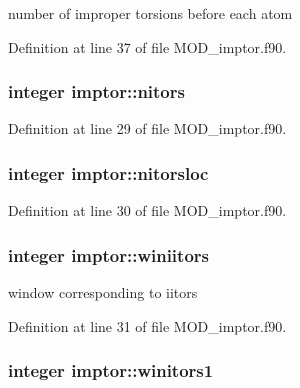 number of improper torsions before each atom 



Definition at line 37 of file M\-O\-D\-\_\-imptor.\-f90.

\hypertarget{classimptor_a7f604e2de3b7f5ba4b6136c0dc063862}{
\subsubsection[{nitors}]{\setlength{\rightskip}{0pt plus 5cm}integer imptor\-::nitors}}\label{classimptor_a7f604e2de3b7f5ba4b6136c0dc063862}


Definition at line 29 of file M\-O\-D\-\_\-imptor.\-f90.

\hypertarget{classimptor_a4a69a70b6d02dcc4c4d15eb06ede36ca}{
\subsubsection[{nitorsloc}]{\setlength{\rightskip}{0pt plus 5cm}integer imptor\-::nitorsloc}}\label{classimptor_a4a69a70b6d02dcc4c4d15eb06ede36ca}


Definition at line 30 of file M\-O\-D\-\_\-imptor.\-f90.

\hypertarget{classimptor_ab6ee996fa64bbafa67f7b735b001c73b}{
\subsubsection[{winiitors}]{\setlength{\rightskip}{0pt plus 5cm}integer imptor\-::winiitors}}\label{classimptor_ab6ee996fa64bbafa67f7b735b001c73b}


window corresponding to iitors 



Definition at line 31 of file M\-O\-D\-\_\-imptor.\-f90.

\hypertarget{classimptor_a4101ad922e3625ead34b2e133bf069df}{
\subsubsection[{winitors1}]{\setlength{\rightskip}{0pt plus 5cm}integer imptor\-::winitors1}}\label{classimptor_a4101ad922e3625ead34b2e133bf069df}


